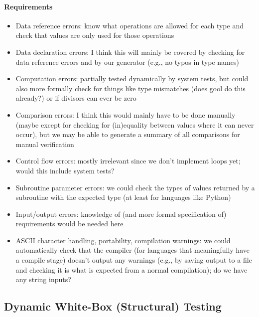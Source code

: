 \paragraph{Requirements}
\begin{itemize}
      \item Data reference errors: know what operations are allowed for each
            type and check that values are only used for those operations
      \item Data declaration errors: I think this will mainly be covered by
            checking for data reference errors and by our generator (e.g., no
            typos in type names)
      \item Computation errors: partially tested dynamically by system tests,
            but could also more formally check for things like type mismatches
            (does \acs{gool} do this already?) or if divisors can ever be zero
      \item Comparison errors: I think this would mainly have to be done
            manually (maybe except for checking for (in)equality between values
            where it can never occur), but we may be able to generate a summary
            of all comparisons for manual verification
      \item Control flow errors: mostly irrelevant since we don't implement
            loops yet; would this include system tests?
      \item Subroutine parameter errors: we could check the types of values
            returned by a subroutine with the expected type (at least for
            languages like Python)
      \item Input/output errors: knowledge of (and more formal specification of)
            requirements would be needed here
      \item ASCII character handling, portability, compilation warnings:
            we could automatically check that the compiler (for languages that
            meaningfully have a compile stage) doesn't output any warnings
            (e.g., by saving output to a file and checking it is what is
            expected from a normal compilation); do we have any string inputs?
\end{itemize}


\subsection{Dynamic White-Box (Structural) Testing
      \cite[p.~105-121]{patton_software_2006}}

